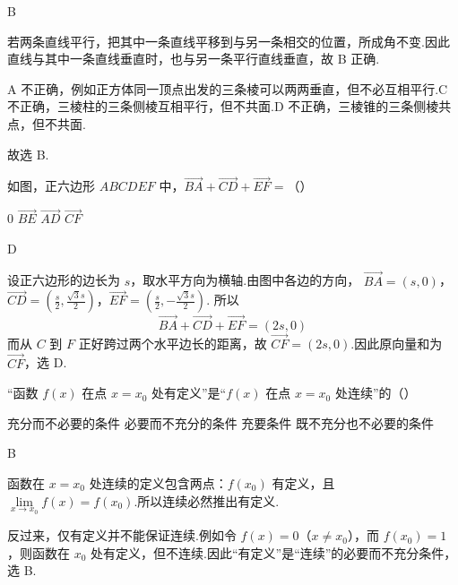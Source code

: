 \begin{answer}
B
\end{answer}

\begin{solution}
若两条直线平行，把其中一条直线平移到与另一条相交的位置，所成角不变.因此直线与其中一条直线垂直时，也与另一条平行直线垂直，故 B 正确.

A 不正确，例如正方体同一顶点出发的三条棱可以两两垂直，但不必互相平行.C 不正确，三棱柱的三条侧棱互相平行，但不共面.D 不正确，三棱锥的三条侧棱共点，但不共面.

故选 B.
\end{solution}

\begin{problem}
如图，正六边形 \(ABCDEF\) 中，\(\overrightarrow{BA} + \overrightarrow{CD} + \overrightarrow{EF} =\)（\quad）


\choices
    {\(0\)}
    {\(\overrightarrow{BE}\)}
    {\(\overrightarrow{AD}\)}
    {\(\overrightarrow{CF}\)}
\end{problem}

\begin{answer}
D
\end{answer}

\begin{solution}
设正六边形的边长为 \(s\)，取水平方向为横轴.由图中各边的方向，
\(\overrightarrow{BA}=(s,0)\)，\(\overrightarrow{CD}=\left(\frac{s}{2},\frac{\sqrt{3}s}{2}\right)\)，\(\overrightarrow{EF}=\left(\frac{s}{2},-\frac{\sqrt{3}s}{2}\right)\).
所以
\[
\overrightarrow{BA}+\overrightarrow{CD}+\overrightarrow{EF}=(2s,0)
\]
而从 \(C\) 到 \(F\) 正好跨过两个水平边长的距离，故 \(\overrightarrow{CF}=(2s,0)\).因此原向量和为 \(\overrightarrow{CF}\)，选 D.
\end{solution}

\begin{problem}
“函数 \(f(x)\) 在点 \(x=x_0\) 处有定义”是“\(f(x)\) 在点 \(x=x_0\) 处连续”的（\quad）

\choices
    {充分而不必要的条件}
    {必要而不充分的条件}
    {充要条件}
    {既不充分也不必要的条件}
\end{problem}

\begin{answer}
B
\end{answer}

\begin{solution}
函数在 \(x=x_0\) 处连续的定义包含两点：\(f(x_0)\) 有定义，且 \(\lim\limits_{x\to x_0}f(x)=f(x_0)\).所以连续必然推出有定义.

反过来，仅有定义并不能保证连续.例如令 \(f(x)=0\)（\(x\neq x_0\)），而 \(f(x_0)=1\)，则函数在 \(x_0\) 处有定义，但不连续.因此“有定义”是“连续”的必要而不充分条件，选 B.
\end{solution}

